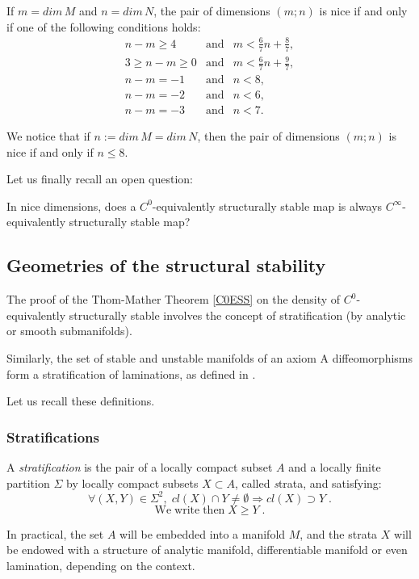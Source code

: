 \documentclass[11pt,openany,leqno]{article}
\begin{document}
\begin{defi}
If $m=dim \, M$ and $n= dim\, N$, the pair of dimensions $(m;n)$ is nice if and only if one of the following conditions holds:
\[\begin{array}{rcl}
n-m \ge  4 & \text{and}&  m<\frac 67 n+\frac 8 7,\\
3\ge n- m \ge  0 & \text{and}& m< \frac 6 7 n +\frac 9 7,\\
 n- m =-1& \text{and}& n <8,\\
 n- m =-2& \text{and}& n <6,\\
 n- m =-3& \text{and}& n <7.\end{array}\]
\end{defi}
We notice that if  $n:=dim\,M=dim\,N$, then the pair of dimensions $(m;n)$ is nice if and only if $n\le 8$.

Let us finally recall an open question: 
\begin{prob}
In nice dimensions,  does a 
$C^0$-equivalently structurally stable map is always $C^\infty$-equivalently structurally stable map? 
\end{prob}
\subsection{Geometries of the structural stability}
The proof of the Thom-Mather Theorem \ref{C0ESS} on the density of $C^0$-equivalently structurally stable involves the concept of stratification (by analytic or smooth submanifolds). 

Similarly, the set of stable and unstable manifolds of an axiom A diffeomorphisms form a stratification of laminations, as defined in \cite{BeMem}.  

Let us recall these definitions.

\subsubsection{Stratifications}

A \emph{ stratification} is the pair of a locally compact subset $A$ and a locally finite partition $\Sigma$ by locally compact subsets $X\subset A$, called {\emph strata}, and satisfying: 
  \[\forall (X,Y)\in \Sigma^2,\; cl(X)\cap Y\not=\emptyset\Rightarrow cl(X)\supset Y\; .\]
\[\mathrm{We\; write \; then \;} X\ge Y\; .\]

In practical, the set $A$ will be embedded into a manifold $M$, and the strata $X$ will be endowed with a structure of analytic manifold, differentiable manifold or even lamination, depending on the context. 
\end{document}

